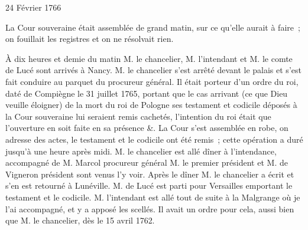                      \begin{diary}{24 Février 1766}{}
                        
                        
                           La Cour souveraine était assemblée de grand matin,
                           sur ce qu'elle aurait à faire ; on fouillait les
                           registres et on ne résolvait rien. \bigskip
        
        
                         À dix heures et demie du matin M. le
                              chancelier, M.
                              l'intendant et M. le comte
                              de Lucé sont arrivés à Nancy. M. le chancelier
                           s'est arrêté devant le
                              palais et s'est fait
                           conduire au parquet du procureur
                              général.
                           Il était porteur d'un ordre du roi, daté
                           de Compiègne
                           le 31 juillet 1765, portant
                           que le cas arrivant (ce que Dieu veuille
                           éloigner) de la mort du roi de Pologne ses testament
                           et codicile déposés à la Cour
                              souveraine
                           lui seraient remis cachetés, l'intention
                           du roi était que
                           l'ouverture en soit faite
                           en sa présence &. La Cour s'est assemblée
                           en robe, on adresse des actes, le testament et le codicile ont été remis ; cette
                           opération
                           a duré jusqu'à une heure après midi. M.
                              le chancelier est allé dîner à l'intendance,
                           accompagné de M. Marcol
                           procureur général
                           M. le
                              premier président et M. de Vigneron
                           président sont
                           venus l'y voir. Après le dîner M. le chancelier
                           a écrit et s'en est retourné à Lunéville.
                           M. de Lucé est parti pour
                              Versailles
                           emportant le testament et le codicile. M.
                              l'intendant est allé tout de suite à la
                              Malgrange où je l'ai accompagné, et y
                           a apposé les scellés. Il avait un ordre pour
                           cela, aussi bien que M. le
                              chancelier, dès
                           le 15 avril 1762. \bigskip
        

\end{diary}
